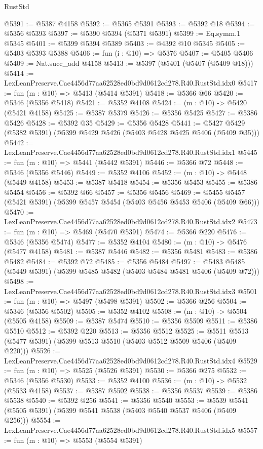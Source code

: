 \begin{lexlean}{RustStd}
\begin{coremodule}
@5391 := @5387 @4158
@5392 := @5365 @5391
@5393 := @5392 @18
@5394 := @5356 @5393
@5397 := @5390 @5394 (@5371 @5391)
@5399 := Eq.symm.{1} @5345
@5401 := @5399 @5394 @5389
@5403 := @4392 @10 @5345
@5405 := @5403 @5393 @5388
@5406 := fun (i : @10) => @5376
@5407 := @5405 @5406
@5409 := Nat.succ_add @4158
@5413 := @5397 (@5401 (@5407 (@5409 @18)))
@5414 := LexLeanPreserve.Cae4456d77aa62528ed0bd9d0612cd278.R40.RustStd.idx0
@5417 := fun (m : @10) => @5413 (@5414 @5391)
@5418 := @5366 @66
@5420 := @5346 (@5356 @5418)
@5421 := @5352 @4108
@5424 := (m : @10) -> @5420 (@5421 @4158)
@5425 := @5387 @5379
@5426 := @5356 @5425
@5427 := @5386 @5426
@5428 := @5392 @35
@5429 := @5356 @5428
@5441 := @5427 @5429 (@5382 @5391) (@5399 @5429 @5426 (@5403 @5428 @5425 @5406 (@5409 @35)))
@5442 := LexLeanPreserve.Cae4456d77aa62528ed0bd9d0612cd278.R40.RustStd.idx1
@5445 := fun (m : @10) => @5441 (@5442 @5391)
@5446 := @5366 @72
@5448 := @5346 (@5356 @5446)
@5449 := @5352 @4106
@5452 := (m : @10) -> @5448 (@5449 @4158)
@5453 := @5387 @5418
@5454 := @5356 @5453
@5455 := @5386 @5454
@5456 := @5392 @66
@5457 := @5356 @5456
@5469 := @5455 @5457 (@5421 @5391) (@5399 @5457 @5454 (@5403 @5456 @5453 @5406 (@5409 @66)))
@5470 := LexLeanPreserve.Cae4456d77aa62528ed0bd9d0612cd278.R40.RustStd.idx2
@5473 := fun (m : @10) => @5469 (@5470 @5391)
@5474 := @5366 @220
@5476 := @5346 (@5356 @5474)
@5477 := @5352 @4104
@5480 := (m : @10) -> @5476 (@5477 @4158)
@5481 := @5387 @5446
@5482 := @5356 @5481
@5483 := @5386 @5482
@5484 := @5392 @72
@5485 := @5356 @5484
@5497 := @5483 @5485 (@5449 @5391) (@5399 @5485 @5482 (@5403 @5484 @5481 @5406 (@5409 @72)))
@5498 := LexLeanPreserve.Cae4456d77aa62528ed0bd9d0612cd278.R40.RustStd.idx3
@5501 := fun (m : @10) => @5497 (@5498 @5391)
@5502 := @5366 @256
@5504 := @5346 (@5356 @5502)
@5505 := @5352 @4102
@5508 := (m : @10) -> @5504 (@5505 @4158)
@5509 := @5387 @5474
@5510 := @5356 @5509
@5511 := @5386 @5510
@5512 := @5392 @220
@5513 := @5356 @5512
@5525 := @5511 @5513 (@5477 @5391) (@5399 @5513 @5510 (@5403 @5512 @5509 @5406 (@5409 @220)))
@5526 := LexLeanPreserve.Cae4456d77aa62528ed0bd9d0612cd278.R40.RustStd.idx4
@5529 := fun (m : @10) => @5525 (@5526 @5391)
@5530 := @5366 @275
@5532 := @5346 (@5356 @5530)
@5533 := @5352 @4100
@5536 := (m : @10) -> @5532 (@5533 @4158)
@5537 := @5387 @5502
@5538 := @5356 @5537
@5539 := @5386 @5538
@5540 := @5392 @256
@5541 := @5356 @5540
@5553 := @5539 @5541 (@5505 @5391) (@5399 @5541 @5538 (@5403 @5540 @5537 @5406 (@5409 @256)))
@5554 := LexLeanPreserve.Cae4456d77aa62528ed0bd9d0612cd278.R40.RustStd.idx5
@5557 := fun (m : @10) => @5553 (@5554 @5391)

\end{coremodule}
\end{lexlean}
